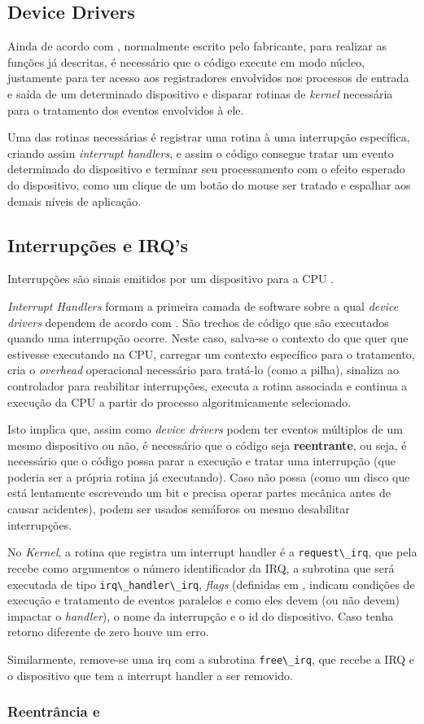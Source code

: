 \documentclass{article}
\begin{document}
\subsection{Device Drivers}

Ainda de acordo com \textcite{TanenbaumBos14}, normalmente escrito pelo
fabricante, para realizar as funções já descritas, é necessário que o código
execute em modo núcleo, justamente para ter acesso aos registradores envolvidos
nos processos de entrada e saída de um determinado dispositivo e disparar
rotinas de \emph{kernel} necessária para o tratamento dos eventos envolvidos à
ele.

Uma das rotinas necessárias é registrar uma rotina à uma interrupção específica,
criando assim \emph{interrupt handlers}, e assim o código consegue tratar um
evento determinado do dispositivo e terminar seu processamento com o efeito
esperado do dispositivo, como um clique de um botão do mouse ser tratado e
espalhar aos demais níveis de aplicação.

\subsection{Interrupções e IRQ's}

Interrupções são sinais emitidos por um dispositivo para a CPU
\cite{interruptsOSDevWiki}.

\emph{Interrupt Handlers} formam a primeira camada de software sobre a qual
\emph{device drivers} dependem de acordo com \cite{TanenbaumBos14}. São trechos
de código que são executados quando uma interrupção ocorre. Neste caso, salva-se
o contexto do que quer que estivesse executando na CPU, carregar um contexto
específico para o tratamento, cria o \emph{overhead} operacional necessário para
tratá-lo (como a pilha), sinaliza ao controlador para reabilitar interrupções,
executa a rotina associada e continua a execução da CPU a partir do processo
algoritmicamente selecionado.

Isto implica que, assim como \emph{device drivers} podem ter eventos múltiplos
de um mesmo dispositivo ou não, é necessário que o código seja \textbf{reentrante},
ou seja, é necessário que o código possa parar a execução e tratar uma
interrupção (que poderia ser a própria rotina já executando). Caso não possa
(como um disco que está lentamente escrevendo um bit e precisa operar partes
mecânica antes de causar acidentes), podem ser usados semáforos ou mesmo
desabilitar interrupções.

No \emph{Kernel}, a rotina que registra um interrupt handler é a
\lstinline{request\_irq}, que pela \cite{LinuxDocsLinuxGenericIRQHandling}
recebe como argumentos o número identificador da IRQ, a subrotina que será
executada de tipo \lstinline{irq\_handler\_irq}, \emph{flags} (definidas em
\cite{interruptHSourceCode}, indicam condições de execução e tratamento de
eventos paralelos e como eles devem (ou não devem) impactar o \emph{handler}), o
nome da interrupção e o id do dispositivo. Caso tenha retorno diferente de zero
houve um erro.

Similarmente, remove-se uma irq com a subrotina \lstinline{free\_irq}, que recebe 
a IRQ e o dispositivo que tem a interrupt handler a ser removido. 

\subsubsection{Reentrância e }

\printbibliography
\end{document}
